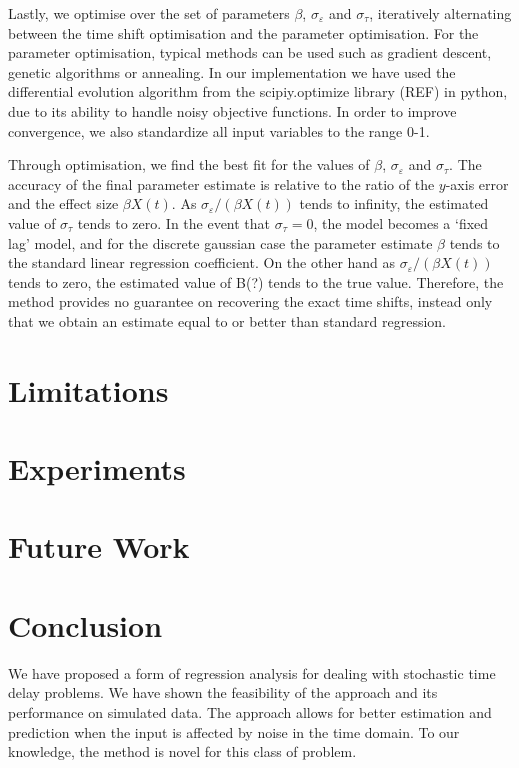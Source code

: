 \documentclass[11pt]{amsart}
\begin{document}
Lastly, we optimise over the set of parameters $\beta$, $\sigma_{\varepsilon}$ and $\sigma_{\tau}$, iteratively alternating between the time shift optimisation and the parameter optimisation. For the parameter optimisation, typical methods can be used such as gradient descent, genetic algorithms or annealing.  In our implementation we have used the differential evolution algorithm from the scipiy.optimize library (REF) in python, due to its ability to handle noisy objective functions. In order to improve convergence, we also standardize all input variables to the range 0-1.

Through optimisation, we find the best fit for the values of $\beta$, $\sigma_{\varepsilon}$ and $\sigma_{\tau}$. The accuracy of the final parameter estimate is relative to the ratio of the $y$-axis error and the effect size $\beta X(t)$. As $\sigma_{\varepsilon}/(\beta X(t))$ tends to infinity, the estimated value of $\sigma_{\tau}$ tends to zero. In the event that $\sigma_{\tau}=0$, the model becomes a ‘fixed lag’ model, and for the discrete gaussian case the parameter estimate $\beta$ tends to the standard linear regression coefficient.
On the other hand as $\sigma_{\varepsilon}/(\beta X(t))$ tends to zero, the estimated value of B(?) tends to the true value. Therefore, the method provides no guarantee on recovering the exact time shifts, instead only that we obtain an estimate equal to or better than standard regression.

\section{Limitations}

\section{Experiments}

\section{Future Work}

\section{Conclusion}

We have proposed a form of regression analysis for dealing with stochastic time delay problems. We have shown the feasibility of the approach and its performance on simulated data. The approach allows for better estimation and prediction when the input is affected by noise in the time domain. To our knowledge, the method is novel for this class of problem.
\end{document}
